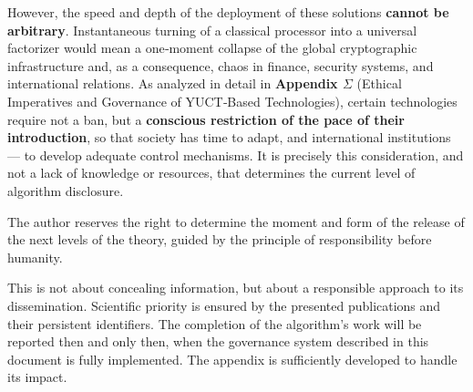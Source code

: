 \documentclass[12pt,a4paper]{article}
\begin{document}
	However, the speed and depth of the deployment of these solutions \textbf{cannot be
		arbitrary}.  Instantaneous turning of a classical processor into a
	universal factorizer would mean a one‑moment collapse of the global
	cryptographic infrastructure and, as a consequence, chaos in finance, security
	systems, and international relations.  As analyzed in detail in
	\textbf{Appendix \(\Sigma\)} (Ethical Imperatives and Governance of YUCT‑Based
	Technologies), certain technologies require not a ban, but a
	\textbf{conscious restriction of the pace of their introduction}, so that society has time
	to adapt, and international institutions — to develop adequate control
	mechanisms.  It is precisely this consideration, and not a lack of knowledge or resources,
	that determines the current level of algorithm disclosure.
	
	The author reserves the right to determine the moment and form of the release
	of the next levels of the theory, guided by the principle of responsibility before
	humanity.
	
	This is not about concealing information, but about a responsible approach to its
	dissemination.  Scientific priority is ensured by the presented publications and
	their persistent identifiers.  The completion of the algorithm’s work will be
	reported then and only then, when the governance system described in this document is fully implemented.
	The appendix is sufficiently developed to handle its impact.
	
\end{document}
